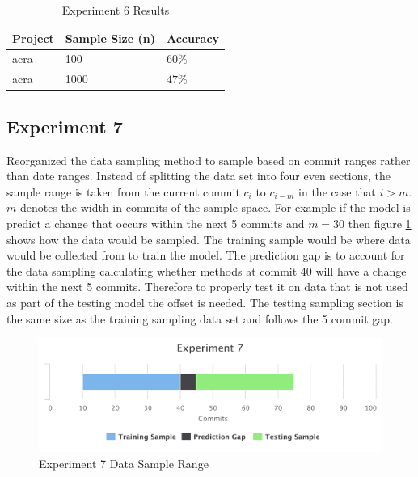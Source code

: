 \begin{table}
\begin{center}
    \begin{tabular}{|l|l|l|}
        \hline
        Project & Sample Size (n) & Accuracy \\
        \hline
        acra & 100 & $60\%$ \\
        acra & 1000 & $47\%$ \\
        \hline
    \end{tabular}
\end{center}
    \caption{Experiment 6 Results}
    \label{tab:experiment_6_results}
\end{table}

\subsection{Experiment 7}

Reorganized the data sampling method to sample based on commit ranges rather than date ranges. Instead of splitting the data set into four even sections, the sample range is taken from the current commit $c_i$ to $c_{i-m}$ in the case that $i > m$. $m$ denotes the width in commits of the sample space. For example if the model is predict a change that occurs within the next 5 commits and $m = 30$ then figure \ref{fig:exp_7_data_range} shows how the data would be sampled. The training sample would be where data would be collected from to train the model. The prediction gap is to account for the data sampling calculating whether methods at commit 40 will have a change within the next 5 commits. Therefore to properly test it on data that is not used as part of the testing model the offset is needed. The testing sampling section is the same size as the training sampling data set and follows the 5 commit gap.

\begin{figure}[!ht]
    \centering
        \includegraphics[width=1.0\textwidth]{images/exp_7_data_range}
    \caption{Experiment 7 Data Sample Range}
    \label{fig:exp_7_data_range}
\end{figure}

